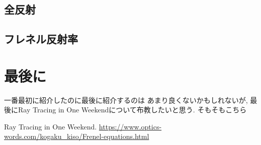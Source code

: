 \documentclass[a4paper, xelatex, ja=standard]{bxjsarticle}
\begin{document}
\subsection{全反射}

\subsection{フレネル反射率}

\section{最後に}
一番最初に紹介したのに最後に紹介するのは
あまり良くないかもしれないが,
最後にRay Tracing in One Weekendについて布教したいと思う.
そもそもこちら

\begin{thebibliography}{9}
 Ray Tracing in One Weekend.
 \url{https://www.optics-words.com/kogaku_kiso/Frenel-equations.html}
\end{thebibliography}
\end{document}
